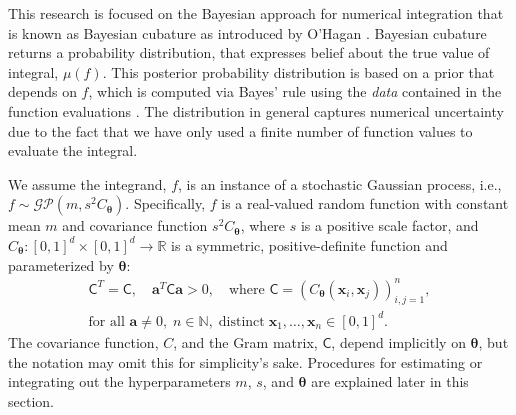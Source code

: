 \documentclass{iitthesis}          %
\newcommand{\bm}[1]{\boldsymbol{#1}}
\newcommand{\vtheta}{{\bm{\theta}}}
\newcommand{\va}{\bm{a}}
\newcommand{\vx}{\bm{x}}
\newcommand{\mC}{\mathsf{C}}
\begin{document}
This research is focused on the Bayesian approach for numerical integration that is known as Bayesian cubature as introduced by O'Hagan \cite{OHagen1991}.  %
Bayesian cubature returns a probability distribution, that expresses belief about the true value of integral, $\mu(f)$.
This posterior probability distribution is based on a prior that depends on $f$, which is computed via Bayes' rule using the \emph{data} contained in the function evaluations \cite{BriEtal18a}. 
The distribution in general captures numerical uncertainty due to the fact that we have only used a finite number of function values to evaluate the integral.

\label{sec:BayesPostErr}

We assume the integrand, $f$, is an instance of a stochastic Gaussian process, i.e., $f \sim \mathcal{GP}(m,s^2 C_\vtheta)$.  Specifically, $f$ is a real-valued random function with constant mean $m$ and covariance function $s^2C_\vtheta$, where $s$ is a positive scale factor, and $C_\vtheta: [0,1]^d \times [0,1]^d \to \mathbb{R} $ is a symmetric, positive-definite function and parameterized by $\vtheta$:
\begin{multline} \label{FJH:eq:CondPosDef}
\mC^T = \mC,  \quad \va^T \mC \va > 0, \quad \text{where }  \mC = \left(  C_\vtheta(\vx_i,\vx_j)  \right)_{i,j=1}^n,\\
 \text{for all } \va \ne 0, \;
 n\in \mathbb{N}, \; \text{distinct} \; \vx_1, \ldots, \vx_n \in [0,1]^d.
\end{multline}
The covariance function, $C$, and the Gram matrix, $\mC$, depend implicitly on $\vtheta$, but the notation may omit this for simplicity's sake.
Procedures for estimating or integrating out the hyperparameters $m$, $s$, and $\vtheta$ are explained later in this section.
\end{document}
